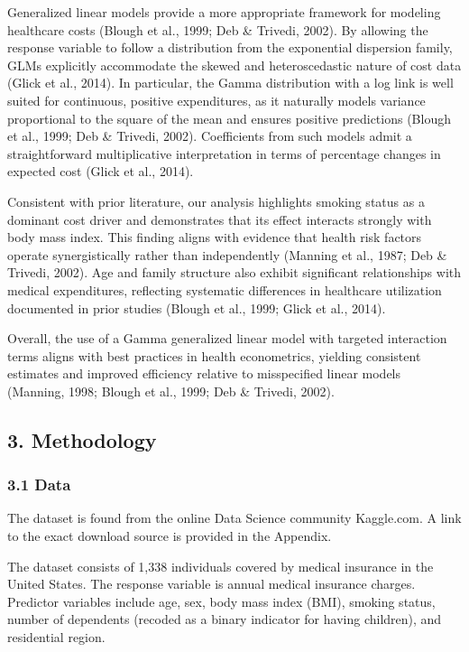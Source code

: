 \documentclass[
  letterpaper,
  DIV=11,
  numbers=noendperiod]{scrartcl}
\begin{document}
Generalized linear models provide a more appropriate framework for
modeling healthcare costs (Blough et al., 1999; Deb \& Trivedi, 2002).
By allowing the response variable to follow a distribution from the
exponential dispersion family, GLMs explicitly accommodate the skewed
and heteroscedastic nature of cost data (Glick et al., 2014). In
particular, the Gamma distribution with a log link is well suited for
continuous, positive expenditures, as it naturally models variance
proportional to the square of the mean and ensures positive predictions
(Blough et al., 1999; Deb \& Trivedi, 2002). Coefficients from such
models admit a straightforward multiplicative interpretation in terms of
percentage changes in expected cost (Glick et al., 2014).

Consistent with prior literature, our analysis highlights smoking status
as a dominant cost driver and demonstrates that its effect interacts
strongly with body mass index. This finding aligns with evidence that
health risk factors operate synergistically rather than independently
(Manning et al., 1987; Deb \& Trivedi, 2002). Age and family structure
also exhibit significant relationships with medical expenditures,
reflecting systematic differences in healthcare utilization documented
in prior studies (Blough et al., 1999; Glick et al., 2014).

Overall, the use of a Gamma generalized linear model with targeted
interaction terms aligns with best practices in health econometrics,
yielding consistent estimates and improved efficiency relative to
misspecified linear models (Manning, 1998; Blough et al., 1999; Deb \&
Trivedi, 2002).

\subsection{\texorpdfstring{\textbf{3.
Methodology}}{3. Methodology}}\label{methodology}

\subsubsection{\texorpdfstring{\textbf{3.1 Data}}{3.1 Data}}\label{data}

The dataset is found from the online Data Science community Kaggle.com.
A link to the exact download source is provided in the Appendix.

The dataset consists of 1,338 individuals covered by medical insurance
in the United States. The response variable is annual medical insurance
charges. Predictor variables include age, sex, body mass index (BMI),
smoking status, number of dependents (recoded as a binary indicator for
having children), and residential region.
\end{document}
